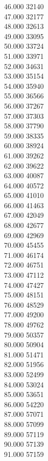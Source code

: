 { 46.000	32140 \\
 47.000	32177 \\
 48.000	32613 \\
 49.000	33095 \\
 50.000	33724 \\
 51.000	33971 \\
 52.000	34631 \\
 53.000	35154 \\
 54.000	35940 \\
 55.000	36566 \\
 56.000	37267 \\
 57.000	37303 \\
 58.000	37790 \\
 59.000	38335 \\
 60.000	38924 \\
 61.000	39262 \\
 62.000	39622 \\
 63.000	40087 \\
 64.000	40572 \\
 65.000	41010 \\
 66.000	41463 \\
 67.000	42049 \\
 68.000	42677 \\
 69.000	42969 \\
 70.000	45455 \\
 71.000	46174 \\
 72.000	46751 \\
 73.000	47112 \\
 74.000	47427 \\
 75.000	48151 \\
 76.000	48529 \\
 77.000	49200 \\
 78.000	49762 \\
 79.000	50357 \\
 80.000	50904 \\
 81.000	51471 \\
 82.000	51956 \\
 83.000	52499 \\
 84.000	53024 \\
 85.000	53651 \\
 86.000	54220 \\
 87.000	57071 \\
 88.000	57099 \\
 89.000	57119 \\
 90.000	57139 \\
 91.000	57159 \\
}
